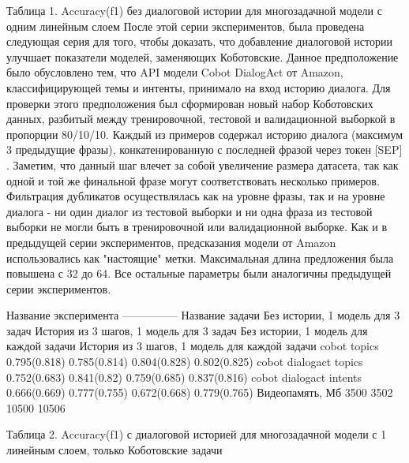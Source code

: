 Таблица 1. Accuracy(f1) без диалоговой истории для многозадачной модели с одним линейным слоем
После этой серии экспериментов, была проведена следующая серия для того, чтобы доказать, что добавление диалоговой истории улучшает показатели моделей, заменяющих Коботовские. Данное предположение было обусловлено тем, что API модели Cobot DialogAct от Amazon, классифицирующей темы и интенты, принимало на вход историю диалога. 
Для проверки этого предположения был сформирован новый набор Коботовских данных, разбитый между тренировочной, тестовой и валидационной выборкой в пропорции 80/10/10. Каждый из примеров содержал историю диалога (максимум 3 предыдущие фразы), конкатенированную с последней фразой через токен [SEP] . Заметим, что данный шаг влечет за собой увеличение размера датасета, так как одной и той же финальной фразе могут соответствовать несколько примеров. Фильтрация дубликатов осуществлялась как на уровне фразы, так и на уровне диалога - ни один диалог из тестовой выборки и ни одна фраза из тестовой выборки не могли быть в тренировочной или валидационной выборке. Как и в предыдущей серии экспериментов, предсказания модели от Amazon использовались как "настоящие" метки. Максимальная длина предложения была повышена с 32 до 64. Все остальные параметры были аналогичны предыдущей серии экспериментов.
    

Название эксперимента
—------------
Название задачи
Без истории, 1 модель для 3 задач
История из 3 шагов, 1 модель для 3 задач
Без истории, 1 модель для каждой задачи
История из 3 шагов, 1 модель для каждой задачи
cobot topics
0.795(0.818)
0.785(0.814)
0.804(0.828)
0.802(0.825)
cobot dialogact topics
0.752(0.683)
0.841(0.82)
0.759(0.685)
0.837(0.816)
cobot dialogact intents
0.666(0.669)
0.777(0.755)
0.672(0.668)
0.779(0.765)
Видеопамять, Мб
3500
3502
10500
10506

Таблица 2. Accuracy(f1) с диалоговой историей для многозадачной модели с 1 линейным слоем, только Коботовские задачи


